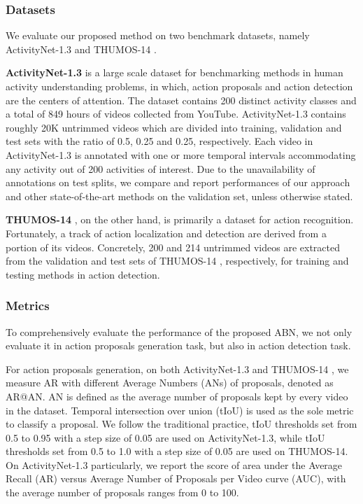 \documentclass{ieeeaccess}
\begin{document}
\subsubsection{Datasets}
We evaluate our proposed method on two benchmark datasets, namely ActivityNet-1.3 \cite{caba2015activitynet} and THUMOS-14 \cite{THUMOS14}.

\noindent
\textbf{ActivityNet-1.3 }\cite{caba2015activitynet} is a large scale dataset for benchmarking methods in human activity understanding problems, in which, action proposals and action detection are the centers of attention. The dataset contains 200 distinct activity classes and a total of 849 hours of videos collected from YouTube. ActivityNet-1.3 \cite{caba2015activitynet} contains roughly 20K untrimmed videos which are divided into training, validation and test sets with the ratio of 0.5, 0.25 and 0.25, respectively. Each video in ActivityNet-1.3 \cite{caba2015activitynet} is annotated with one or more temporal intervals accommodating any activity out of 200 activities of interest. Due to the unavailability of annotations on test splits, we compare and report performances of our approach and other state-of-the-art methods on the validation set, unless otherwise stated.

\noindent
\textbf{THUMOS-14} \cite{THUMOS14}, on the other hand, is primarily a dataset for action recognition. Fortunately, a track of action localization and detection are derived from a portion of its videos. Concretely, 200 and 214 untrimmed videos are extracted from the validation and test sets of THUMOS-14 \cite{THUMOS14}, respectively, for training and testing methods in action detection.


\subsubsection{Metrics}
\label{subsubsec:metric}
To comprehensively evaluate the performance of the proposed ABN, we not only evaluate it in action proposals generation task, but also in action detection task.

For action proposals generation, on both ActivityNet-1.3 \cite{caba2015activitynet} and THUMOS-14 \cite{THUMOS14}, we measure AR with different Average Numbers (ANs) of proposals, denoted as AR@AN. AN is defined as the average number of proposals kept by every video in the dataset. Temporal intersection over union (tIoU) is used as the sole metric to classify a proposal. We follow the traditional practice, tIoU thresholds set from 0.5 to 0.95 with a step size of 0.05 are used on ActivityNet-1.3, while tIoU thresholds set from 0.5 to 1.0 with a step size of 0.05 are used on THUMOS-14. On ActivityNet-1.3 particularly, we report the score of area under the Average Recall (AR) versus Average Number of Proposals per Video curve (AUC), with the average number of proposals ranges from 0 to 100.
\end{document}
